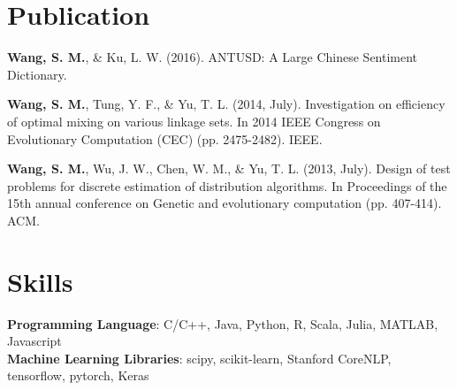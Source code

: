 \documentclass[a4paper,9pt]{article}
\begin{document}
\section{Publication}
\textbf{Wang, S. M.}, \& Ku, L. W. (2016). ANTUSD: A Large Chinese Sentiment Dictionary.

\textbf{Wang, S. M.}, Tung, Y. F., \& Yu, T. L. (2014, July). Investigation on efficiency of optimal mixing on various linkage sets. In 2014 IEEE Congress on Evolutionary Computation (CEC) (pp. 2475-2482). IEEE.

\textbf{Wang, S. M.}, Wu, J. W., Chen, W. M., \& Yu, T. L. (2013, July). Design of test problems for discrete estimation of distribution algorithms. In Proceedings of the 15th annual conference on Genetic and evolutionary computation (pp. 407-414). ACM.

\section{Skills}
\textbf{Programming Language}: C/C++, Java, Python, R, Scala, Julia, MATLAB, Javascript \\
\textbf{Machine Learning Libraries}: scipy, scikit-learn, Stanford CoreNLP, tensorflow, pytorch, Keras \\
\end{document}
